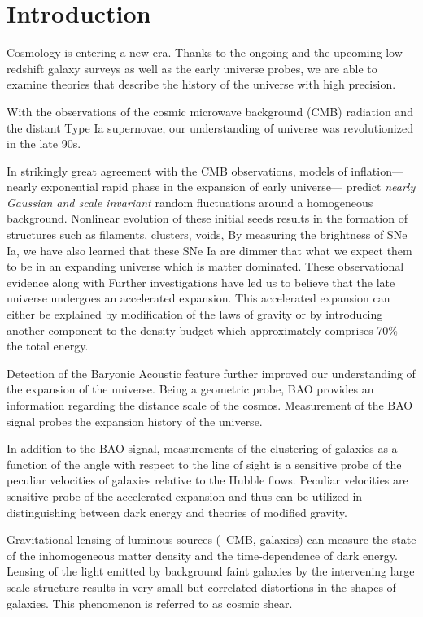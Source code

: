 \chapter*{Introduction}

Cosmology is entering a new era. Thanks to the ongoing and 
the upcoming low redshift galaxy surveys as well as the early universe probes, 
we are able to examine theories that describe the history of the universe with 
high precision.
 
With the observations of the cosmic microwave background (CMB) radiation 
and the distant Type Ia supernovae, our understanding of universe was 
revolutionized in the late 90s. 

In strikingly great agreement with the CMB observations, models of inflation---nearly 
exponential rapid phase in the expansion of early universe--- 
predict \emph{nearly Gaussian and scale invariant} random fluctuations around a homogeneous 
background. Nonlinear evolution of these initial seeds results in the formation of structures such as 
filaments, clusters, voids, \etc\.

By measuring the brightness of SNe Ia, we have also learned 
that these SNe Ia are dimmer that what we expect them to be in an expanding universe which is matter dominated. 
These observational evidence along with Further investigations have led us to 
believe that the late universe undergoes an accelerated expansion. This accelerated expansion 
can either be explained by modification of the laws of gravity or by introducing another component to 
the density budget which approximately comprises 70$\%$ the total energy. 

Detection of the Baryonic Acoustic feature further improved our understanding 
of the expansion of the universe. Being a geometric probe, BAO provides an information 
regarding the distance scale of the cosmos. Measurement of the BAO signal probes the 
expansion history of the universe.

In addition to the BAO signal, measurements of the clustering of galaxies as a function 
of the angle with respect to the line of sight is a sensitive probe of the peculiar velocities 
of galaxies relative to the Hubble flows. Peculiar velocities are sensitive probe of the 
accelerated expansion and thus can be utilized in distinguishing between dark energy and 
theories of modified gravity.

Gravitational lensing of luminous sources (\eg\ CMB, galaxies) can measure 
the state of the inhomogeneous matter density and the time-dependence of dark energy. 
Lensing of the light emitted by background faint galaxies by the intervening large scale structure 
results in very small but correlated distortions in the shapes of galaxies. This phenomenon is referred to 
as cosmic shear.


